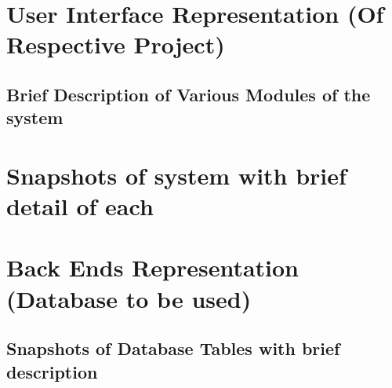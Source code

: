 \section{User Interface Representation (Of  Respective Project)
}
\subsection{Brief Description of Various Modules of the system
}
\section{Snapshots of system with brief detail of each
}
\section{Back Ends Representation (Database to be used)
}
\subsection{Snapshots of Database Tables with brief description
}